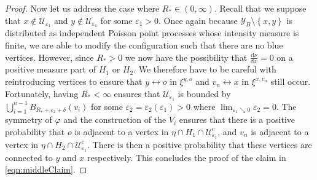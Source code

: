 \documentclass[10pt,a4paper,dvipsnames]{article}
\theoremstyle{definition}
\theoremstyle{remark}
\newcommand{\Ycal}{\mathcal{Y}}
\newcommand{\Ucal}{\mathcal{U}}
\newcommand{\dd}{\mathrm{d}} %
\newcommand{\conn}[3]{#1 \longleftrightarrow #2\textrm { in } #3}
\newcommand{\orig}{o}
\newcommand{\connf}{\varphi}
\numberwithin{equation}{section}
\begin{document}
\begin{proof}
    Now let us address the case where $R_*\in\left(0,\infty\right)$. Recall that we suppose that $x\not\in\Ucal_{\varepsilon_1}$ and $y\not\in\Ucal_{\varepsilon_1}$ for some $\varepsilon_1>0$. Once again because $\Ycal_B\setminus\left\{x,y\right\}$ is distributed as independent Poisson point processes whose intensity measure is finite, we are able to modify the configuration such that there are no blue vertices. However, since $R_*>0$ we now have the possibility that $\frac{\dd \nu}{\dd x}=0$ on a positive measure part of $ H_1$ or $ H_2$. We therefore have to be careful with reintroducing vertices to ensure that $\conn{y}{\orig}{\xi^{y,\orig}}$ and $\conn{v_n}{x}{\xi^{x,v_n}}$ still occur. Fortunately, having $R_*<\infty$ ensures that $\Ucal_{\varepsilon_1}$ is bounded by $\bigcup^{n-1}_{i=1}B_{R_*+\varepsilon_2+\delta}(v_i)$ for some $\varepsilon_2=\varepsilon_2\left(\varepsilon_1\right)>0$ where $\lim_{\varepsilon_1\searrow0}\varepsilon_2=0$. The symmetry of $\connf$ and the construction of the $V_i$ ensures that there is a positive probability that $\orig$ is adjacent to a vertex in $\eta\cap H_1\cap\Ucal^\mathrm{c}_{\varepsilon_1} $, and $v_n$ is adjacent to a vertex in $\eta\cap H_2\cap\Ucal^\mathrm{c}_{\varepsilon_1} $. There is then a positive probability that these vertices are connected to $y$ and $x$ respectively. This concludes the proof of the claim in \eqref{eqn:middleClaim}.


\end{proof}
\end{document}
